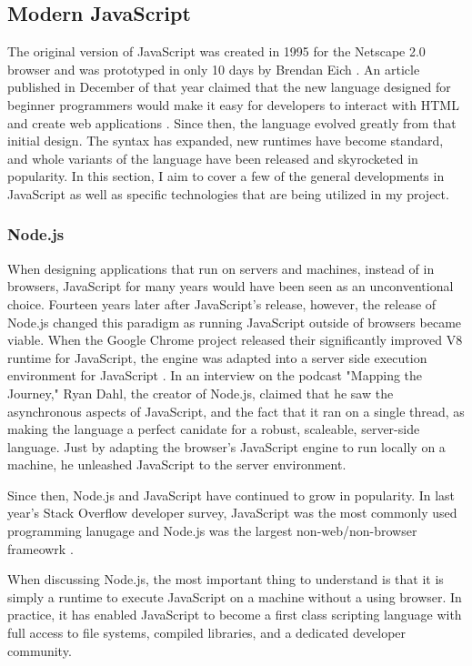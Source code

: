 \subsection{Modern JavaScript}

The original version of JavaScript was created in 1995 for the Netscape 2.0 browser and was prototyped in only 10 days by Brendan Eich \cite{redhatinc.CreatingJavaScript}.  An article published in December of that year claimed that the new language designed for beginner programmers would make it easy for developers to interact with HTML and create web applications \cite{bucholtzNewLanguageAims1995}.  Since then, the language evolved greatly from that initial design.  The syntax has expanded, new runtimes have become standard, and whole variants of the language have been released and skyrocketed in popularity.  In this section, I aim to cover a few of the general developments in JavaScript as well as specific technologies that are being utilized in my project.

\subsubsection{Node.js}
When designing applications that run on servers and machines, instead of in browsers, JavaScript for many years would have been seen as an unconventional choice.  Fourteen years later after JavaScript's release, however, the release of Node.js changed this paradigm as running JavaScript outside of browsers became viable. When the Google Chrome project released their significantly improved V8 runtime for JavaScript, the engine was adapted into a server side execution environment for JavaScript \cite{pramodEpisodeInterviewRyan}.  In an interview on the podcast "Mapping the Journey," Ryan Dahl, the creator of Node.js, claimed that he saw the asynchronous aspects of JavaScript, and the fact that it ran on a single thread, as making the language a perfect canidate for a robust, scaleable, server-side language.  Just by adapting the browser's JavaScript engine to run locally on a machine, he unleashed JavaScript to the server environment.

Since then, Node.js and JavaScript have continued to grow in popularity. In last year's Stack Overflow developer survey, JavaScript was the most commonly used programming lanugage and Node.js was the largest non-web/non-browser  frameowrk \cite{stackoverflowStackOverflowDeveloper}.

When discussing Node.js, the most important thing to understand is that it is simply a runtime to execute JavaScript on a machine without a using browser.  In practice, it has enabled JavaScript to become a first class scripting language with full access to file systems, compiled libraries, and a dedicated developer community.

